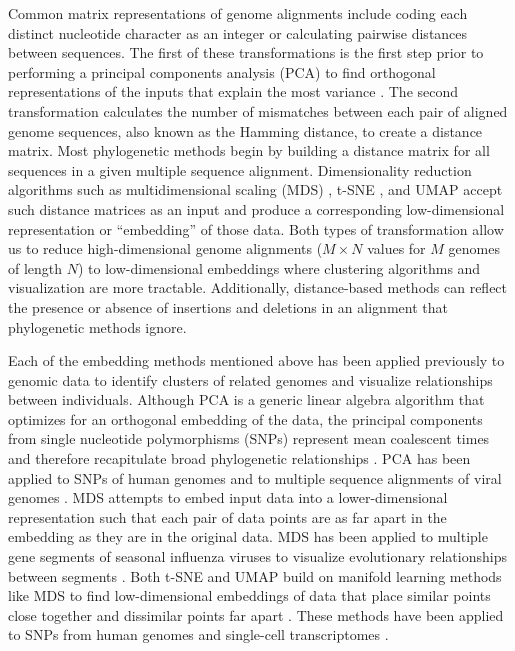 \documentclass[10pt,letterpaper]{article}
\begin{document}
Common matrix representations of genome alignments include coding each distinct nucleotide character as an integer or calculating pairwise distances between sequences.
The first of these transformations is the first step prior to performing a principal components analysis (PCA) to find orthogonal representations of the inputs that explain the most variance \cite{mcvean_2009}.
The second transformation calculates the number of mismatches between each pair of aligned genome sequences, also known as the Hamming distance, to create a distance matrix.
Most phylogenetic methods begin by building a distance matrix for all sequences in a given multiple sequence alignment.
Dimensionality reduction algorithms such as multidimensional scaling (MDS) \cite{hout_papesh_goldinger_2012}, t-SNE \cite{maaten2008visualizing}, and UMAP \cite{lel2018umap} accept such distance matrices as an input and produce a corresponding low-dimensional representation or ``embedding'' of those data.
Both types of transformation allow us to reduce high-dimensional genome alignments ($M \times N$ values for $M$ genomes of length $N$) to low-dimensional embeddings where clustering algorithms and visualization are more tractable.
Additionally, distance-based methods can reflect the presence or absence of insertions and deletions in an alignment that phylogenetic methods ignore.

Each of the embedding methods mentioned above has been applied previously to genomic data to identify clusters of related genomes and visualize relationships between individuals.
Although PCA is a generic linear algebra algorithm that optimizes for an orthogonal embedding of the data, the principal components from single nucleotide polymorphisms (SNPs) represent mean coalescent times and therefore recapitulate broad phylogenetic relationships \cite{mcvean_2009}.
PCA has been applied to SNPs of human genomes \cite{novembre_2008,alexander_2009,mcvean_2009,auton_2015} and to multiple sequence alignments of viral genomes \cite{metsky_2017}.
MDS attempts to embed input data into a lower-dimensional representation such that each pair of data points are as far apart in the embedding as they are in the original data.
MDS has been applied to multiple gene segments of seasonal influenza viruses to visualize evolutionary relationships between segments \cite{rambaut_2008}.
Both t-SNE and UMAP build on manifold learning methods like MDS to find low-dimensional embeddings of data that place similar points close together and dissimilar points far apart \cite{kobak_2021}.
These methods have been applied to SNPs from human genomes \cite{diaz-papkovich_2019} and single-cell transcriptomes \cite{becht_2018,kobak_2019}.
\end{document}
